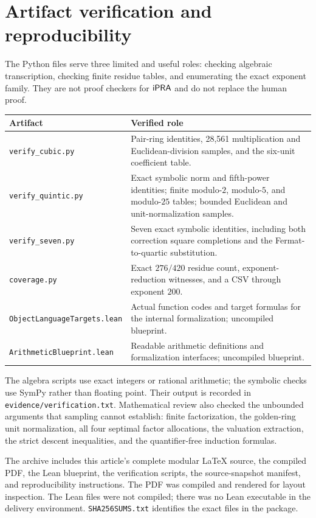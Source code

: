 \section{Artifact verification and reproducibility}
\label{sec:verification}

The Python files serve three limited and useful roles: checking algebraic
transcription, checking finite residue tables, and enumerating the exact
exponent family. They are not proof checkers for $\mathsf{iPRA}$ and do not replace
the human proof.

\begin{center}
\begin{tabular}{>{\raggedright\arraybackslash}p{}>{\raggedright\arraybackslash}p{}}
\toprule
Artifact & Verified role\\
\midrule
\texttt{verify\_cubic.py} & Pair-ring identities, 28,561 multiplication
and Euclidean-division samples, and the six-unit coefficient table.\\
\texttt{verify\_quintic.py} & Exact symbolic norm and fifth-power
identities; finite modulo-$2$, modulo-$5$, and modulo-$25$ tables;
bounded Euclidean and unit-normalization samples.\\
\texttt{verify\_seven.py} & Seven exact symbolic identities, including
both correction square completions and the Fermat-to-quartic substitution.\\
\texttt{coverage.py} & Exact $276/420$ residue count, exponent-reduction
witnesses, and a CSV through exponent $200$.\\
\texttt{ObjectLanguageTargets.lean} & Actual function codes and target
formulas for the internal formalization; uncompiled blueprint.\\
\texttt{ArithmeticBlueprint.lean} & Readable arithmetic definitions and
formalization interfaces; uncompiled blueprint.\\
\bottomrule
\end{tabular}
\end{center}

The algebra scripts use exact integers or rational arithmetic; the
symbolic checks use SymPy rather than floating point. Their output is
recorded in \texttt{evidence/verification.txt}. Mathematical review also
checked the unbounded arguments that sampling cannot establish: finite
factorization, the golden-ring unit normalization, all four septimal
factor allocations, the valuation extraction, the strict descent
inequalities, and the quantifier-free induction formulas.

The archive includes this article's complete modular LaTeX source,
the compiled PDF, the Lean blueprint, the verification scripts, the
source-snapshot manifest, and reproducibility instructions. The PDF was
compiled and rendered for layout inspection. The Lean files were not
compiled; there was no Lean executable in the delivery environment.
\texttt{SHA256SUMS.txt} identifies the exact files in the package.

